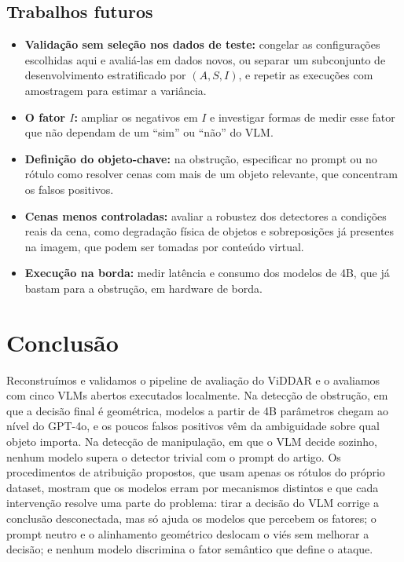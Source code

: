 \documentclass[journal,onecolumn]{IEEEtran}
\begin{document}
\subsection{Trabalhos futuros}
\begin{itemize}
\item \textbf{Validação sem seleção nos dados de teste:} congelar as configurações escolhidas aqui e
  avaliá-las em dados novos, ou separar um subconjunto de desenvolvimento estratificado por
  $(A,S,I)$, e repetir as execuções com amostragem para estimar a variância.
\item \textbf{O fator $I$:} ampliar os negativos em $I$ e investigar formas de medir esse fator que não
  dependam de um ``sim'' ou ``não'' do VLM.
\item \textbf{Definição do objeto-chave:} na obstrução, especificar no prompt ou no rótulo como resolver
  cenas com mais de um objeto relevante, que concentram os falsos positivos.
\item \textbf{Cenas menos controladas:} avaliar a robustez dos detectores a condições reais da cena, como
  degradação física de objetos e sobreposições já presentes na imagem, que podem ser tomadas por
  conteúdo virtual.
\item \textbf{Execução na borda:} medir latência e consumo dos modelos de 4B, que já bastam para a
  obstrução, em hardware de borda.
\end{itemize}

\section{Conclusão}
Reconstruímos e validamos o pipeline de avaliação do ViDDAR e o avaliamos com cinco VLMs abertos
executados localmente. Na detecção de obstrução, em que a decisão final é geométrica, modelos a partir
de 4B parâmetros chegam ao nível do GPT-4o, e os poucos falsos positivos vêm da ambiguidade sobre qual
objeto importa. Na detecção de manipulação, em que o VLM decide sozinho, nenhum modelo supera o detector
trivial com o prompt do artigo. Os procedimentos de atribuição propostos, que usam apenas os rótulos do
próprio dataset, mostram que os modelos erram por mecanismos distintos e que cada intervenção resolve
uma parte do problema: tirar a decisão do VLM corrige a conclusão desconectada, mas só ajuda os modelos
que percebem os fatores; o prompt neutro e o alinhamento geométrico deslocam o viés sem melhorar a
decisão; e nenhum modelo discrimina o fator semântico que define o ataque.
\end{document}

